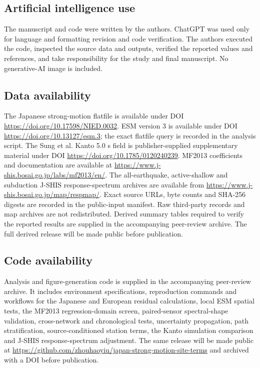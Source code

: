 \documentclass[11pt]{article}
\begin{document}
\subsection{Artificial intelligence use}

The manuscript and code were written by the authors. ChatGPT was used only for language and formatting revision and code verification. The authors executed the code, inspected the source data and outputs, verified the reported values and references, and take responsibility for the study and final manuscript. No generative-AI image is included.

\subsection{Data availability}

The Japanese strong-motion flatfile is available under DOI \url{https://doi.org/10.17598/NIED.0032}. ESM version 3 is available under DOI \url{https://doi.org/10.13127/esm.3}; the exact flatfile query is recorded in the analysis script. The Sung et al. Kanto 5.0 s field is publisher-supplied supplementary material under DOI \url{https://doi.org/10.1785/0120240239}. MF2013 coefficients and documentation are available at \url{https://www.j-shis.bosai.go.jp/labs/mf2013/en/}. The all-earthquake, active-shallow and subduction J-SHIS response-spectrum archives are available from \url{https://www.j-shis.bosai.go.jp/map/respmap/}. Exact source URLs, byte counts and SHA-256 digests are recorded in the public-input manifest. Raw third-party records and map archives are not redistributed. Derived summary tables required to verify the reported results are supplied in the accompanying peer-review archive. The full derived release will be made public before publication.

\subsection{Code availability}

Analysis and figure-generation code is supplied in the accompanying peer-review archive. It includes environment specifications, reproduction commands and workflows for the Japanese and European residual calculations, local ESM spatial tests, the MF2013 regression-domain screen, paired-sensor spectral-shape validation, cross-network and chronological tests, uncertainty propagation, path stratification, source-conditioned station terms, the Kanto simulation comparison and J-SHIS response-spectrum adjustment. The same release will be made public at \url{https://github.com/zhouhaoyiu/japan-strong-motion-site-terms} and archived with a DOI before publication.
\end{document}
